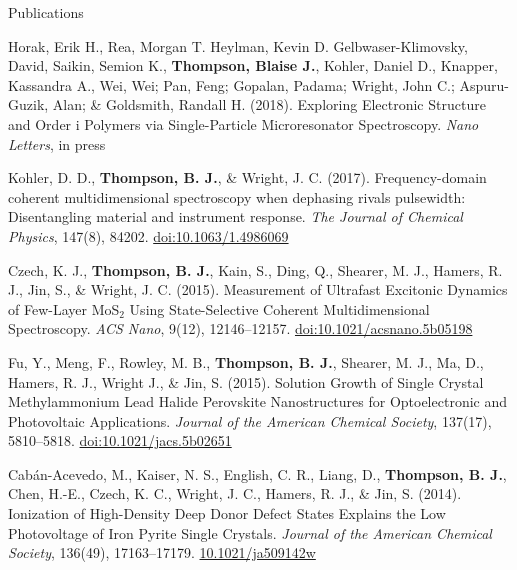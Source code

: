 \documentclass{resume}  %
\begin{document}
\clearpage

\begin{rSection}{Publications}
  \begin{etaremune}[leftmargin = 1.75em]
    \item Horak, Erik H., Rea, Morgan T. Heylman, Kevin D. Gelbwaser-Klimovsky, David, Saikin,
      Semion K., \textbf{Thompson, Blaise J.}, Kohler, Daniel D., Knapper, Kassandra A., Wei, Wei;
      Pan, Feng; Gopalan, Padama; Wright, John C.; Aspuru-Guzik, Alan; \& Goldsmith, Randall H.
      (2018).
      Exploring Electronic Structure and Order i Polymers via Single-Particle Microresonator
      Spectroscopy.
      \textit{Nano Letters}, in press
    \item Kohler, D. D., \textbf{Thompson, B. J.}, \& Wright, J. C. (2017). Frequency-domain
      coherent multidimensional spectroscopy when dephasing rivals pulsewidth:
      Disentangling material and instrument response.
      \textit{The Journal of Chemical Physics}, 147(8), 84202.
      \href{https://doi.org/10.1063/1.4986069}{doi:10.1063/1.4986069}
    \item Czech, K. J., \textbf{Thompson, B. J.}, Kain, S., Ding, Q., Shearer, M. J., Hamers,
      R. J., Jin, S., \& Wright, J. C. (2015). Measurement of Ultrafast Excitonic Dynamics of
      Few-Layer MoS$_2$ Using State-Selective Coherent Multidimensional Spectroscopy.
      \textit{ACS Nano}, 9(12), 12146–12157.
      \href{https://doi.org/10.1021/acsnano.5b05198}{doi:10.1021/acsnano.5b05198}
    \item Fu, Y., Meng, F., Rowley, M. B., \textbf{Thompson, B. J.}, Shearer, M. J.,
      Ma, D., Hamers, R. J., Wright J., \& Jin, S. (2015). Solution Growth of Single Crystal
      Methylammonium Lead Halide Perovskite Nanostructures for Optoelectronic and
      Photovoltaic Applications.
      \textit{Journal of the American Chemical Society}, 137(17), 5810–5818.
      \href{https://doi.org/10.1021/jacs.5b02651}{doi:10.1021/jacs.5b02651}
    \item Cabán-Acevedo, M., Kaiser, N. S., English, C. R., Liang, D., \textbf{Thompson, B. J.},
      Chen, H.-E., Czech, K. C., Wright, J. C., Hamers, R. J., \& Jin, S. (2014).
      Ionization of High-Density Deep Donor Defect States Explains the Low
      Photovoltage of Iron Pyrite Single Crystals.
      \textit{Journal of the American Chemical Society}, 136(49), 17163–17179.
      \href{https://doi.org/10.1021/ja509142w}{10.1021/ja509142w}
  \end{etaremune}
\end{rSection}
\end{document}
